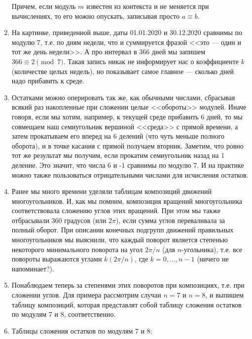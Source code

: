 \begin{enumerate}
Причем, если модуль $m$ известен из контекста и не меняется при вычислениях, то его можно опускать, записывая просто $a\equiv b$. 

\item На картинке, приведенной выше, даты 01.01.2020 и 30.12.2020 сравнимы по модулю 7, т.е. по дням недели, что и суммируется фразой <<это --- один и тот же день недели>>.
А про интервал в 366 дней мы запишем $366\equiv 2\pmod 7$. Такая запись никак не информирует нас о коэффициенте $k$ (количестве целых недель), но показывает самое главное --- сколько дней надо прибавить к среде.



\item Остатками можно оперировать так же, как обычными числами, сбрасывая всякий раз накопленные при сложении целые <<обороты>> модулей. Иначе говоря, если мы хотим, например, к текущей среде прибавить 6 дней, то мы совмещаем наш семиугольник вершиной <<среда>> с прямой времени, а затем прокатываем его вперед на 6 делений (что чуть меньше полного оборота), и в точке касания с прямой получаем вторник. Заметим, что ровно тот же результат мы получим, если прокатим семиугольник назад на 1 деление. Это значит, что числа 6 и -1 сравнимы по модулю 7. И на практике можно также пользоваться отрицательными числами для исчисления остатков.
\item Ранее мы много времени уделяли таблицам композиций движений многоугольников. И, как мы помним, композиция вращений многоугольника соответствовала сложению углов этих вращений. При этом мы также отбрасывали 360 градусов (или $2\pi$), если сумма углов переваливала за полный оборот. При описании конечных подгрупп движений правильных многоугольников мы выяснили, что каждый поворот является степенью некоторого минимального поворота на угол $2\pi/n$ (для $n$-угольника), т.е. все повороты выражаются углами $k(2\pi/n)$, где $k=0,\dots,n-1$ (ничего не напоминает?).
\item Понаблюдаем теперь за степенями этих поворотов при композициях, т.е. при сложении углов. Для примера рассмотрим случаи $n=7$ и $n=8$, и выпишем таблицу композиций, которая представлят собой таблицу сложения остатков по модулям 7 и 8, соответственно.
\item Таблицы сложения остатков по модулям 7 и 8:
\begin{center}
\begin{tabular}{c||c|c|c|c|c|c|c|}

\end{tabular}
\end{center}
\end{enumerate}
